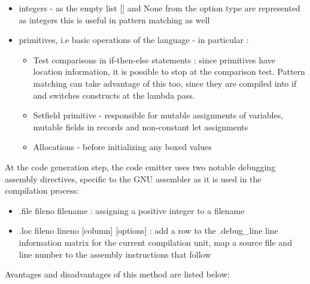 \begin{itemize}
    \item integers - as the empty list [] and None from the option type are represented as integers
        this is useful in pattern matching as well
    \item primitives, i.e basic operations of the language - in particular :
        \begin{itemize}
            \item
                Test comparisons in if-then-else statements :
                since primitives have location information, it is possible to
                stop at the comparison test.
                Pattern matching can take advantage of this too, since they are compiled into
                if and switches constructs at the lambda pass.
            \item
                Setfield primitive - responsible for mutable assignments of variables, mutable
                fields in records and non-constant let assignments
            \item
                Allocations - before initializing any boxed values
        \end{itemize}
\end{itemize}

At the code generation step, the code emitter uses two notable debugging
assembly directives, specific to the GNU assembler as it is used in the
compilation process:


\begin{itemize}
    \item .file fileno filename : assigning a positive integer to a filename
    \item .loc fileno lineno [column] [options] : add a row to the .debug\_line
        line information matrix for the current compilation unit, map a source
        file and line number to the assembly instructions that follow
\end{itemize}

Avantages and disadvantages of this method are listed below:

